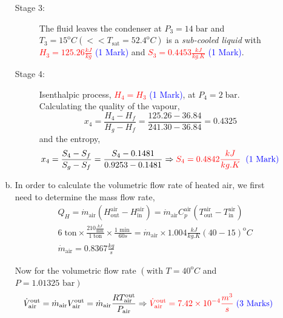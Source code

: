 \documentclass[12pt,twoside]{report}
\newcommand{\frc}{\displaystyle\frac}
\begin{document}
\begin{description}
\begin{enumerate}[(a)]
\begin{description}
\item [Stage 3:] The fluid leaves the condenser at $P_{3}=14\;\text{bar}$ and $T_{3}=15^{\text{o}}C\left( << T_{\text{sat}}=52.4^{\text{o}}C\right)$ is a {\it sub-cooled liquid} with \textcolor{red}{$H_{3}=125.26\frc{kJ}{kg}$} \textcolor{blue}{(1 Mark)} and \textcolor{red}{$S_{3}=0.4453\frc{kJ}{kg.K}$} \textcolor{blue}{(1 Mark)}.

\item [Stage 4:] Isenthalpic process, \textcolor{red}{$H_{4}=H_{3}$} \textcolor{blue}{(1 Mark)}, at $P_{4}=2\;\text{bar}$. Calculating the quality of the vapour,
\begin{displaymath}
x_{4}=\frc{H_{4}-H_{f}}{H_{g}-H_{f}}=\frc{125.26-36.84}{241.30-36.84}=0.4325
\end{displaymath}
and the entropy,
\begin{displaymath}
x_{4}=\frc{S_{4}-S_{f}}{S_{g}-S_{f}}=\frc{S_{4}-0.1481}{0.9253-0.1481} \Rightarrow \textcolor{red}{S_{4}=0.4842\frc{kJ}{kg.K}}\;\;\textcolor{blue}{\text{(1 Mark)}}
\end{displaymath}
\end{description}

%
\item In order to calculate the volumetric flow rate of heated air, we first need to determine the mass flow rate,
\begin{eqnarray}
&&Q_{H} = \dot{m}_{\text{air}}\left(H_{\text{out}}^{\text{air}}-H_{\text{in}}^{\text{air}}\right) = \dot{m}_{\text{air}}C_{p}^{\text{air}}\left(T_{\text{out}}^{\text{air}}-T_{\text{in}}^{\text{air}}\right) \nonumber \\
&&6\;\text{ton} \times \frc{210\frc{kJ}{\text{min}}}{1\;\text{ton}}\times\frc{1\text{ min }}{60s}=\dot{m}_{\text{air}}\times 1.004\frc{kJ}{kg.K}\left(40-15\right)^{\text{o}}C\nonumber \\
&&\dot{m}_{\text{air}} =0.8367 \frc{kg}{s} \nonumber 
\end{eqnarray}

Now for the volumetric flow rate $\left(\text{with }T=40^{\text{o}}C\right.$ and $\left.P=1.01325\text{ bar}\right)$
\begin{displaymath}
\dot{V}_{\text{air}}^{\text{out}}=\dot{m}_{\text{air}}V_{\text{air}}^{\text{out}}=\dot{m}_{\text{air}}\frc{RT_{\text{air}}^{\text{out}}}{P_{\text{air}}}\Rightarrow \textcolor{red}{\dot{V}_{\text{air}}^{\text{out}}=7.42\times 10^{-4}\frc{m^{3}}{s}}\;\textcolor{blue}{\text{(3 Marks)}}
\end{displaymath}


\end{enumerate}
\end{description}
\end{document}
